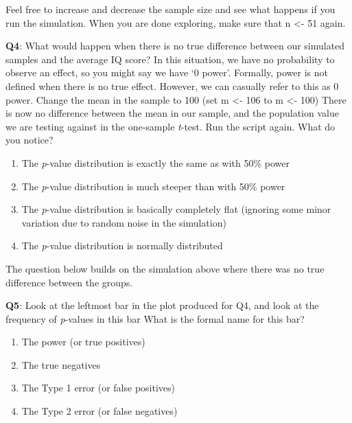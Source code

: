 \documentclass[
]{krantz}
\providecommand{\tightlist}{%
  \setlength{\itemsep}{0pt}\setlength{\parskip}{0pt}}
\begin{document}
Feel free to increase and decrease the sample size and see what happens if you run the simulation. When you are done exploring, make sure that n \textless- 51 again.

\textbf{Q4}: What would happen when there is no true difference between our simulated samples and the average IQ score? In this situation, we have no probability to observe an effect, so you might say we have `0 power'. Formally, power is not defined when there is no true effect. However, we can casually refer to this as 0 power. Change the mean in the sample to 100 (set m \textless- 106 to m \textless- 100) There is now no difference between the mean in our sample, and the population value we are testing against in the one-sample \emph{t}-test. Run the script again. What do you notice?

\begin{enumerate}
\def\labelenumi{\Alph{enumi})}
\tightlist
\item
  The \emph{p}-value distribution is exactly the same as with 50\% power
\item
  The \emph{p}-value distribution is much steeper than with 50\% power
\item
  The \emph{p}-value distribution is basically completely flat (ignoring some minor variation due to random noise in the simulation)
\item
  The \emph{p}-value distribution is normally distributed
\end{enumerate}

The question below builds on the simulation above where there was no true difference between the groups.

\textbf{Q5}: Look at the leftmost bar in the plot produced for Q4, and look at the frequency of \emph{p}-values in this bar What is the formal name for this bar?

\begin{enumerate}
\def\labelenumi{\Alph{enumi})}
\tightlist
\item
  The power (or true positives)
\item
  The true negatives
\item
  The Type 1 error (or false positives)
\item
  The Type 2 error (or false negatives)
\end{enumerate}
\end{document}
